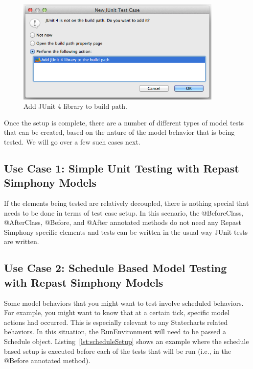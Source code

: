 \documentclass[11pt]{amsart}
\begin{document}
\begin{enumerate}
\begin{figure}
\begin{center}
\vspace{.2in}
\centerline {
\includegraphics[width=4in]{RepastModelTestingImages/AddToBuildPath.png}
}
\caption{Add JUnit 4 library to build path.}
\label{fig:AddToBuildPath}
\end{center}
\end{figure}

\end{enumerate}
\clearpage

Once the setup is complete, there are a number of different types of model tests that can be created, based on the nature of the model behavior that is being tested. We will go over a few such cases next.

\subsection{Use Case 1: Simple Unit Testing with Repast Simphony Models}
If the elements being tested are relatively decoupled, there is nothing special that needs to be done in terms of test case setup. In this scenario, the @BeforeClass, @AfterClass, @Before, and @After annotated methods do not need any Repast Simphony specific elements and tests can be written in the usual way JUnit tests are written.

\subsection{Use Case 2: Schedule Based Model Testing with Repast Simphony Models}
\label{sec:use2}
Some model behaviors that you might want to test involve scheduled behaviors. For example, you might want to know that at a certain tick, specific model actions had occurred. This is especially relevant to any Statecharts related behaviors. In this situation, the RunEnvironment will need to be passed a Schedule object. Listing~\ref{lst:scheduleSetup} shows an example where the schedule based setup is executed before each of the tests that will be run (i.e., in the @Before annotated method).
 
\end{document}
